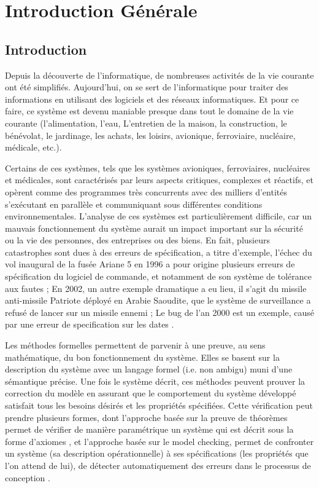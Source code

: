 \chapter*{Introduction Générale}

\section*{Introduction}
Depuis la découverte de l’informatique, de nombreuses activités de la vie courante ont été simplifiés. Aujourd'hui, on se sert de l’informatique pour traiter des informations en utilisant des logiciels et des réseaux informatiques. Et pour ce faire, ce système est devenu maniable presque dans tout le domaine de la vie courante (l'alimentation, l'eau, L’entretien de la maison, la construction, le bénévolat, le jardinage, les achats, les loisirs, avionique, ferroviaire, nucléaire, médicale, etc.).

Certains de ces systèmes, tels que les systèmes avioniques, ferroviaires, nucléaires et médicales, sont caractérisés par leurs aspects critiques, complexes et réactifs, et opèrent comme des programmes très concurrents avec des milliers d’entités s’exécutant en parallèle et communiquant sous différentes conditions environnementales. L’analyse de ces systèmes est particulièrement difficile, car un mauvais fonctionnement du système aurait un impact important sur la sécurité ou la vie des personnes, des entreprises ou des biens. En fait, plusieurs catastrophes sont dues à des erreurs de spécification, a titre d'exemple, l'échec du vol inaugural de la fusée Ariane 5 en 1996 a pour origine  plusieurs erreurs de spécification du logiciel de commande, et notamment de son système de tolérance aux fautes \cite{arian5}; En 2002, un autre exemple dramatique a eu lieu, il s'agit du missile anti-missile Patriote déployé en Arabie Saoudite, que le système de surveillance a refusé de lancer sur un missile ennemi \cite{patriot}; Le bug de l'an 2000 est un exemple, causé par une erreur de specification sur les dates \cite{bug2000}.

Les méthodes formelles permettent de parvenir à une preuve, au sens mathématique, du bon fonctionnement du système. Elles se basent sur la description du système avec un langage formel (i.e. non ambigu) muni d’une sémantique précise. Une fois le système décrit, ces méthodes peuvent prouver la correction du modèle en assurant que le comportement du système développé satisfait tous les besoins désirés et les propriétés spécifiées. Cette vérification peut prendre plusieurs formes, dont l’approche basée sur la preuve de théorèmes permet de vérifier de manière paramétrique un système qui est décrit sous la forme d’axiomes \cite{Rushby2001}, et l’approche basée sur le model checking, permet de confronter un système (sa description opérationnelle) à ses spécifications (les propriétés que l’on attend de lui), de détecter automatiquement des erreurs dans le processus de conception \cite{Clark1999}.

